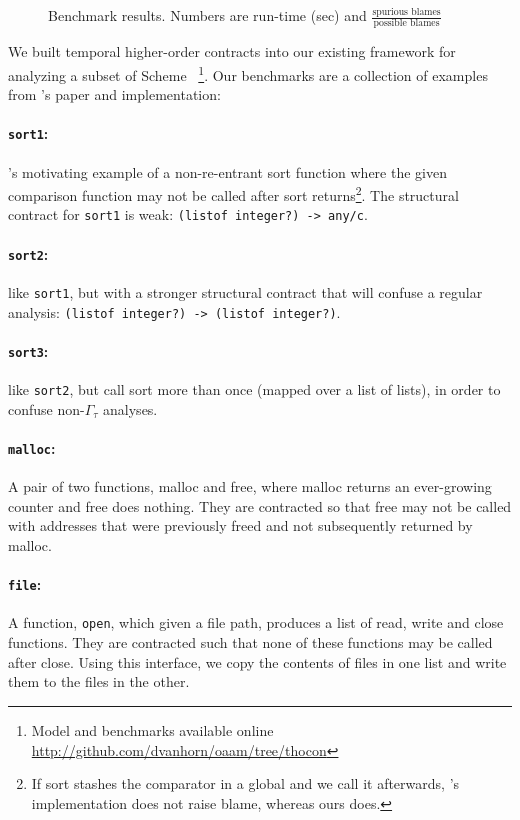 \begin{figure}
  
  \caption{Benchmark results. Numbers are run-time (sec) and $\frac{\text{spurious blames}}{\text{possible blames}}$}
  \label{fig:evaluation}
\end{figure}
We built temporal higher-order contracts into our existing framework for analyzing a subset of Scheme~\citep{ianjohnson:oaam:icfp2013} \footnote{Model and benchmarks available online \url{http://github.com/dvanhorn/oaam/tree/thocon}}.
%
Our benchmarks are a collection of examples from \dfm's paper and implementation:
\paragraph{{\tt sort1}:}{\dfm's motivating example of a non-re-entrant sort function where the given comparison function may not be called after sort returns\footnote{If sort stashes the comparator in a global and we call it afterwards, \dfm's implementation does not raise blame, whereas ours does.}.
%
The structural contract for {\tt sort1} is weak: {\tt (listof integer?) -> any/c}.
}
\paragraph{{\tt sort2}:}{like {\tt sort1}, but with a stronger structural contract that will confuse a regular analysis: {\tt (listof integer?) -> (listof integer?)}.}
\paragraph{{\tt sort3}:}{like {\tt sort2}, but call sort more than once (mapped over a list of lists), in order to confuse non-$\Gamma_\tau$ analyses.}
\paragraph{{\tt malloc}:}{A pair of two functions, malloc and free, where malloc returns an ever-growing counter and free does nothing. They are contracted so that free may not be called with addresses that were previously freed and not subsequently returned by malloc.}
\paragraph{{\tt file}:}{A function, {\tt open}, which given a file path, produces a list of read, write and close functions. They are contracted such that none of these functions may be called after close. Using this interface, we copy the contents of files in one list and write them to the files in the other.}

